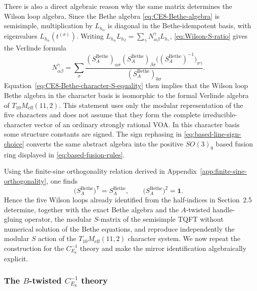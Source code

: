 \documentclass[11pt,a4paper]{article}
\numberwithin{equation}{section}
\begin{document}
There is also a direct algebraic reason why the same matrix determines the Wilson loop algebra.  Since the Bethe algebra \eqref{eq:CE8-Bethe-algebra} is semisimple, multiplication by $L_{h_\alpha}$ is diagonal in the Bethe-idempotent basis, with eigenvalues $L_{h_\alpha}(t^{(\sigma)})$.  Writing
$L_{h_\alpha}L_{h_\beta}=\sum_\gamma N^{\gamma}_{\alpha\beta}L_{h_\gamma}$,
\eqref{eq:Wilson-S-ratio} gives the Verlinde formula
\begin{equation}
  N^{\gamma}_{\alpha\beta}
  =\sum_{\sigma}
  \frac{
    (S_A^{\mathrm{Bethe}})_{\alpha\sigma}
    (S_A^{\mathrm{Bethe}})_{\beta\sigma}
    \bigl((S_A^{\mathrm{Bethe}})^{-1}\bigr)_{\sigma\gamma}
  }{
    (S_A^{\mathrm{Bethe}})_{0\sigma}
  }.
  \label{eq:Bethe-Verlinde-diagonalization}
\end{equation}
Equation~\eqref{eq:CE8-Bethe-character-S-equality} then implies that the Wilson loop Bethe algebra in the character basis is isomorphic to the formal Verlinde algebra of $T_{10}M_{\mathrm{eff}}(11,2)$.  This statement uses only the modular representation of the five characters and does not assume that they form the complete irreducible-character vector of an ordinary strongly rational VOA.  In this character basis some structure constants are signed.  The sign rephasing in \eqref{eq:based-line-sign-choice} converts the same abstract algebra into the positive $SO(3)_9$ based fusion ring displayed in \eqref{eq:based-fusion-rules}.

Using the finite-sine orthogonality relation derived in Appendix~\ref{app:finite-sine-orthogonality}, one finds
\begin{equation}
  \bigl(S_A^{\mathrm{Bethe}}\bigr)^{\mathsf T}=S_A^{\mathrm{Bethe}},
  \qquad
  \bigl(S_A^{\mathrm{Bethe}}\bigr)^2=\mathbf 1.
  \label{eq:CE8-S-relations}
\end{equation}
Hence the five Wilson loops already identified from the half-indices in Section~2.5 determine, together with the exact Bethe algebra and the $A$-twisted handle-gluing operator, the modular $S$-matrix of the semisimple TQFT without numerical solution of the Bethe equations, and reproduce independently the modular $S$ action of the $T_{10}M_{\mathrm{eff}}(11,2)$ character system.  We now repeat the construction for the $C_{E_8}^{-1}$ theory and make the mirror identification algebraically explicit.

\subsubsection{The $B$-twisted $C_{E_8}^{-1}$ theory}
\label{subsubsec:B-twisted-CE8inv-S}
\end{document}
